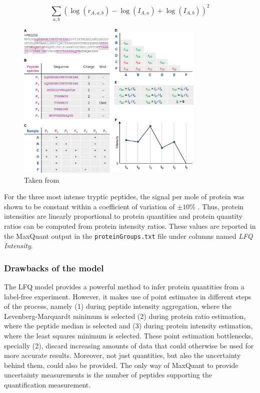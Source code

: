 \documentclass[11pt, a4paper]{report}
\begin{document}
\begin{equation}\label{eq:least_squares}
\sum_{a,b} (\log{(r_{A, a,b})} - \log{(I_{A,a})} + \log{(I_{A,b})})^2
\end{equation}

\begin{figure}[!h]
\centering
\includegraphics[width=0.8\textwidth]{protein_quant_inference}
\caption{Taken from \cite{Cox2014}}
\label{figure:protein_quant_inference}
\end{figure}

For the three most intense tryptic peptides, the signal per mole of protein was shown to be constant within a coefficient of variation of $\pm 10 \%$ \cite{Mikalsen2007}. Thus, protein intensities are linearly proportional to protein quantities and protein quantity ratios can be computed from protein intensity ratios. These values are reported in the MaxQuant output in the \texttt{proteinGroups.txt} file under columns named \textit{LFQ Intensity}.
		
\subsubsection{Drawbacks of the model}

The LFQ model provides a powerful method to infer protein quantities from a label-free experiment. However, it makes use of point estimates in different steps of the process, namely (1) during peptide intensity aggregation, where the Levenberg-Marquardt minimum is selected (2) during protein ratio estimation, where the peptide median is selected and (3) during protein intensity estimation, where the least squares minimum is selected. These point estimation bottlenecks, specially (2), discard increasing amounts of data that could otherwise be used for more accurate results. Moreover, not just quantities, but also the uncertainty behind them, could also be provided. The only way of MaxQuant to provide uncertainty measurements is the number of peptides supporting the quantification measurement.
\end{document}
